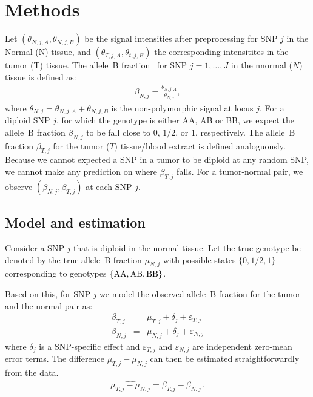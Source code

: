 \documentclass[10pt]{bmc_article}
\newenvironment{bmcformat}{\fussy\setboolean{publ}{true}}{\fussy}
\newcommand{\gAA}{\textnormal{AA}\xspace}
\newcommand{\gAB}{\textnormal{AB}\xspace}
\newcommand{\gBB}{\textnormal{BB}\xspace}
\newcommand{\eps}{\varepsilon\xspace}
\begin{document}
\begin{bmcformat}
 
\section*{Methods}
Let $(\theta_{N,j,A}, \theta_{N,j,B})$ be the signal intensities after preprocessing for SNP $j$ in the Normal (N) tissue, and $(\theta_{T,j,A}, \theta_{t,j,B})$ the corresponding intensitites in the tumor (T) tissue. The allele~B fraction~\cite{PeifferD_etal_2006} for SNP $j=1,\ldots,J$ in the nnormal ($N$) tissue is defined as:
\begin{eqnarray*}
  \beta_{N,j} = \frac{\theta_{N,j,A}}{\theta_{N,j}},
\end{eqnarray*}
where $\theta_{N,j} = \theta_{N,j,A} + \theta_{N,j,B}$ is the non-polymorphic signal at locus $j$.
For a diploid SNP $j$, for which the genotype is either AA, AB or BB, we expect the allele~B fraction $\beta_{N,j}$ to be fall close to $0$, $1/2$, or $1$, respectively.
The allele~B fraction $\beta_{T,j}$ for the tumor ($T$) tissue/blood extract is defined analoguously. Because we cannot expected a SNP in a tumor to be diploid at any random SNP, we cannot make any prediction on where $\beta_{T,j}$ falls. For a tumor-normal pair, we observe $(\beta_{N,j}, \beta_{T,j})$ at each SNP $j$.

\subsection*{Model and estimation}
Consider a SNP $j$ that is diploid in the normal tissue.  
Let the true genotype be denoted by the true allele~B fraction $\mu_{N,j}$ with possible states $\{0,1/2,1\}$ corresponding to genotypes $\{\gAA,\gAB,\gBB\}$.

Based on this, for SNP $j$ we model the observed allele~B fraction for the tumor and the normal pair as:
\begin{eqnarray*}
  \beta_{T,j} & = & \mu_{T,j} + \delta_{j} + \eps_{T,j}\\
  \beta_{N,j} & = & \mu_{N,j} + \delta_{j} + \eps_{N,j}
\end{eqnarray*}
where $\delta_{j}$ is a SNP-specific effect and $\eps_{T,j}$ and $\eps_{N,j}$ are independent zero-mean error terms. The difference $\mu_{T,j}-\mu_{N,j}$ can then be estimated straightforwardly from the data.
\begin{eqnarray*}
  \widehat{\mu_{T,j}-\mu_{N,j}} = \beta_{T,j} - \beta_{N,j}\,.
\end{eqnarray*}


\end{bmcformat}
\end{document}
